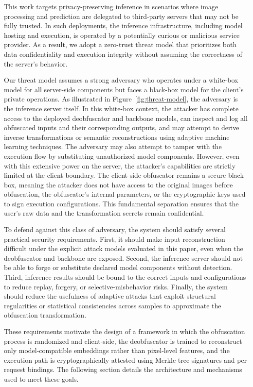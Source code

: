 \documentclass{ieeeaccess}
\newcommand{\rev}[1]{{\color{green}#1}}
\begin{document}
This work targets privacy-preserving inference in scenarios where image processing and prediction are delegated to third-party servers that may not be fully trusted. In such deployments, the inference infrastructure, including model hosting and execution, is operated by a potentially curious or malicious service provider. As a result, we adopt a zero-trust threat model that prioritizes both data confidentiality and execution integrity without assuming the correctness of the server's behavior.

{Our threat model assumes a strong adversary who operates under a white-box model for all server-side components but faces a black-box model for the client's private operations. As illustrated in Figure}~\ref{fig:threat-model}{, the adversary is the inference server itself. In this white-box context, the attacker has complete access to the deployed deobfuscator and backbone models, can inspect and log all obfuscated inputs and their corresponding outputs, and may attempt to derive inverse transformations or semantic reconstructions using adaptive machine learning techniques. The adversary may also attempt to tamper with the execution flow by substituting unauthorized model components. However, even with this extensive power on the server, the attacker's capabilities are strictly limited at the client boundary. The client-side obfuscator remains a secure black box, meaning the attacker does not have access to the original images before obfuscation, the obfuscator's internal parameters, or the cryptographic keys used to sign execution configurations. This fundamental separation ensures that the user's raw data and the transformation secrets remain confidential.}


\rev{To defend against this class of adversary, the system should satisfy several practical security requirements. First, it should make input reconstruction difficult under the explicit attack models evaluated in this paper, even when the deobfuscator and backbone are exposed. Second, the inference server should not be able to forge or substitute declared model components without detection. Third, inference results should be bound to the correct inputs and configurations to reduce replay, forgery, or selective-misbehavior risks. Finally, the system should reduce the usefulness of adaptive attacks that exploit structural regularities or statistical consistencies across samples to approximate the obfuscation transformation.}

These requirements motivate the design of a framework in which the obfuscation process is randomized and client-side, the deobfuscator is trained to reconstruct only model-compatible embeddings rather than pixel-level features, and the execution path is cryptographically attested using Merkle tree signatures and per-request bindings. The following section details the architecture and mechanisms used to meet these goals.
\end{document}
